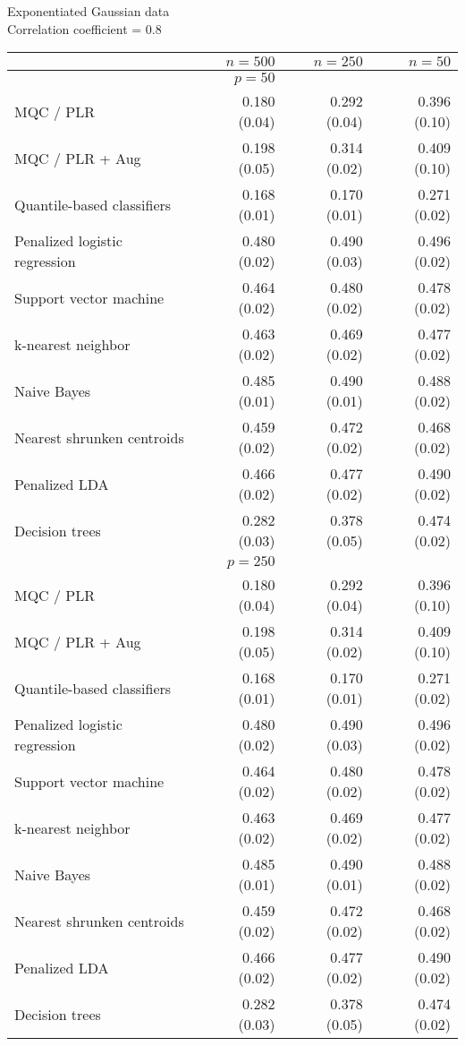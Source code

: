 \begin{table}[p]
  \centering
  Exponentiated Gaussian data \\
  Correlation coefficient = 0.8 \\[2ex]
  \begin{adjustbox}{max size={\textwidth}{10cm}}
    \begin{tabular}{l@{\extracolsep{15mm}}rrr}
      
      \hline
      & $n=500$ & $n=250$ & $n=50$ \\ 
      \hline
      & $p = 50$ \\
      \hline

      MQC / PLR & 0.180 (0.04) & 0.292 (0.04) & 0.396 (0.10) \\ 
      MQC / PLR + Aug & 0.198 (0.05) & 0.314 (0.02) & 0.409 (0.10) \\ 
      Quantile-based classifiers & 0.168 (0.01) & 0.170 (0.01) & 0.271 (0.02) \\ 
      Penalized logistic regression & 0.480 (0.02) & 0.490 (0.03) & 0.496 (0.02) \\ 
      Support vector machine & 0.464 (0.02) & 0.480 (0.02) & 0.478 (0.02) \\ 
      k-nearest neighbor & 0.463 (0.02) & 0.469 (0.02) & 0.477 (0.02) \\ 
      Naive Bayes & 0.485 (0.01) & 0.490 (0.01) & 0.488 (0.02) \\ 
      Nearest shrunken centroids & 0.459 (0.02) & 0.472 (0.02) & 0.468 (0.02) \\ 
      Penalized LDA & 0.466 (0.02) & 0.477 (0.02) & 0.490 (0.02) \\ 
      Decision trees & 0.282 (0.03) & 0.378 (0.05) & 0.474 (0.02) \\ [2ex]

      \hline
      & $p = 250$ \\
      \hline

      MQC / PLR & 0.180 (0.04) & 0.292 (0.04) & 0.396 (0.10) \\ 
      MQC / PLR + Aug & 0.198 (0.05) & 0.314 (0.02) & 0.409 (0.10) \\ 
      Quantile-based classifiers & 0.168 (0.01) & 0.170 (0.01) & 0.271 (0.02) \\ 
      Penalized logistic regression & 0.480 (0.02) & 0.490 (0.03) & 0.496 (0.02) \\ 
      Support vector machine & 0.464 (0.02) & 0.480 (0.02) & 0.478 (0.02) \\ 
      k-nearest neighbor & 0.463 (0.02) & 0.469 (0.02) & 0.477 (0.02) \\ 
      Naive Bayes & 0.485 (0.01) & 0.490 (0.01) & 0.488 (0.02) \\ 
      Nearest shrunken centroids & 0.459 (0.02) & 0.472 (0.02) & 0.468 (0.02) \\ 
      Penalized LDA & 0.466 (0.02) & 0.477 (0.02) & 0.490 (0.02) \\ 
      Decision trees & 0.282 (0.03) & 0.378 (0.05) & 0.474 (0.02) \\ [2ex]


\end{tabular}
\end{adjustbox}
\end{table}
